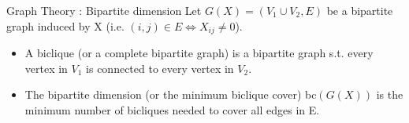 \begin{frame}{Graph Theory : Bipartite dimension}
Let $G(X) = (V_1 \cup V_2, E)$ be a bipartite graph induced by X (i.e. $(i,j)\in E \Leftrightarrow X_{ij}\neq 0$).
\begin{defn}
\begin{itemize}
\item A biclique (or a complete bipartite graph) is a bipartite graph s.t. every vertex in $V_1$ is connected to every vertex in $V_2$. 
\item The bipartite dimension (or the minimum biclique cover) bc$(G(X))$ is the minimum number of bicliques needed to cover all edges in E.
\end{itemize} 
\end{defn}

\end{frame}

